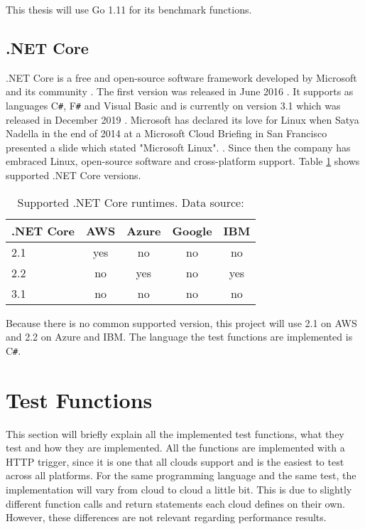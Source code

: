 This thesis will use Go 1.11 for its benchmark functions.
\subsection{.NET Core}

.NET Core is a free and open-source software framework developed by Microsoft and its community \cite{.NETCore}. The first version was released in June 2016 \cite{.NETCoreReleases}. It supports as languages C\texttt{\#}, F\texttt{\#} and Visual Basic \cite{.NETAbout} and is currently on version 3.1 which was released in December 2019 \cite{.NETCoreBlog}. Microsoft has declared its love for Linux when Satya Nadella in the end of 2014 at a Microsoft Cloud Briefing in San Francisco presented a slide which stated "Microsoft  Linux". \cite{MicrosoftCloudBlog}. Since then the company has embraced Linux, open-source software and cross-platform support. Table \ref{table:dotnet} shows supported .NET Core versions.

\begin{table}[htp]
\centering
\captionsetup[table]{justification=centering, labelfont=bf}
\begin{tabular}{|l|c|c|c|c|} 
 \hline
 .NET Core & AWS & Azure & Google & IBM \\ \hline
2.1  & \cellcolor{green!25}yes    & \cellcolor{red!25}no    & \cellcolor{red!25}no  & \cellcolor{red!25}no\\ \hline
2.2  & \cellcolor{red!25}no    & \cellcolor{green!25}yes    & \cellcolor{red!25}no  & \cellcolor{green!25}yes\\ \hline
3.1  & \cellcolor{red!25}no    & \cellcolor{red!25}no    & \cellcolor{red!25}no  & \cellcolor{red!25}no\\ \hline
\end{tabular}
\caption[Supported .NET Core runtimes]{Supported .NET Core runtimes. Data source: \cite{AWSLambdaLanguages, AzureFunctionsLanguages, GoogleFunctionsLanguages, IBMRuntimes}}
\label{table:dotnet}
\end{table}

Because there is no common supported version, this project will use 2.1 on \gls{AWS} and 2.2 on Azure and \gls{IBM}. The language the test functions are implemented is C\texttt{\#}.

\section{Test Functions}
\label{sec:tests}
This section will briefly explain all the implemented test functions, what they test and how they are implemented. All the functions are implemented with a \gls{HTTP} trigger, since it is one that all clouds support and is the easiest to test across all platforms. For the same programming language and the same test, the implementation will vary from cloud to cloud a little bit. This is due to slightly different function calls and return statements each cloud defines on their own. However, these differences are not relevant regarding performance results.
